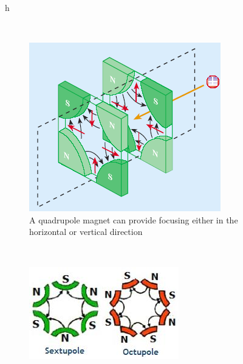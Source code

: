 \begin{figure}{h}
\begin{subfigure}[h]{0.450\textwidth}
      \end{subfigure}
      ~ %
      \begin{subfigure}[h]{0.450\textwidth}
        \includegraphics[width=\textwidth]{Figures/LHC_Diagrams/LHC_Quadrupole_Focusing.png}
        \caption{A quadrupole magnet can provide focusing either in
          the horizontal or vertical direction}\label{fig:lhc_quadrupole_field}
      \end{subfigure}
       ~ %
      \begin{subfigure}[h]{0.450\textwidth}
        \includegraphics[width=\textwidth]{Figures/LHC_Diagrams/LHC_MultipoleFields.jpg}

\end{subfigure}
\end{figure}

